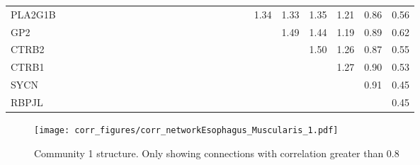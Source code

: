 \begin{longtable}{lrrrrrrrrrrrrrrrrrrrrrrrrr}
PLA2G1B  &              &              &              &              &             &             &             &             &            &              &            &            &            &             &           &             &                &           &               &      1.34 &        1.33 &        1.35 &       1.21 &        0.86 &        0.56 \\
GP2      &              &              &              &              &             &             &             &             &            &              &            &            &            &             &           &             &                &           &               &           &        1.49 &        1.44 &       1.19 &        0.89 &        0.62 \\
CTRB2    &              &              &              &              &             &             &             &             &            &              &            &            &            &             &           &             &                &           &               &           &             &        1.50 &       1.26 &        0.87 &        0.55 \\
CTRB1    &              &              &              &              &             &             &             &             &            &              &            &            &            &             &           &             &                &           &               &           &             &             &       1.27 &        0.90 &        0.53 \\
SYCN     &              &              &              &              &             &             &             &             &            &              &            &            &            &             &           &             &                &           &               &           &             &             &            &        0.91 &        0.45 \\
RBPJL    &              &              &              &              &             &             &             &             &            &              &            &            &            &             &           &             &                &           &               &           &             &             &            &             &        0.45 \\
\end{longtable}


\begin{figure}[h!]
\centering
\texttt{[image: corr\_figures/corr\_networkEsophagus\_Muscularis\_1.pdf]}
\caption{Community 1 structure. Only showing connections with correlation greater than 0.8}
\end{figure}




